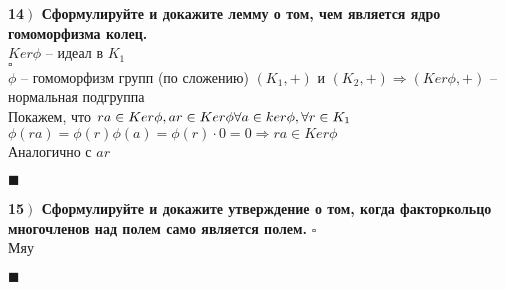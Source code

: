 \documentclass[a4paper,12pt]{article}
\begin{document}
    \textbf{14$\left.\right)$ Сформулируйте и докажите лемму о том, чем является ядро гомоморфизма колец.} \\$Ker\phi$ -- идеал в $K_1$\\
    $\square$\\
    $\phi$ -- гомоморфизм групп (по сложению) $(K_1, +)$ и $(K_2, +)\Rightarrow(Ker\phi, +)$ -- нормальная подгруппа\\
    Покажем, что $ra\in Ker\phi, ar\in Ker\phi\\ \forall a\in ker\phi, \forall r\in K_1$\\
    $\phi(ra)=\phi(r)\phi(a)=\phi(r)\cdot 0=0\Rightarrow ra\in Ker\phi$\\
    Аналогично с $ar$
    \begin{flushright}
        $\blacksquare$
    \end{flushright}

    \textbf{15$\left.\right)$ Сформулируйте и докажите утверждение о том, когда факторкольцо многочленов над полем само является полем.}
    $\square$\\
        Мяу
    \begin{flushright}
        $\blacksquare$
    \end{flushright}
\end{document}
